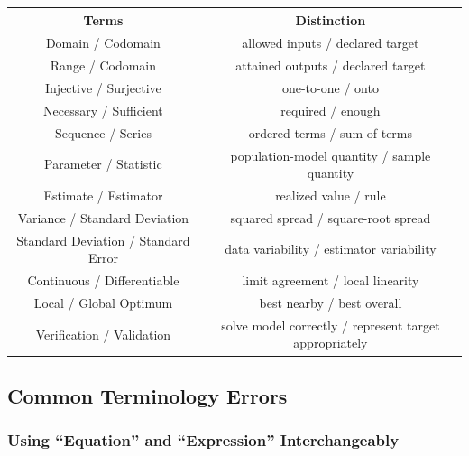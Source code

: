 \begin{center}
\begin{tabular}{c|c}
\textbf{Terms}
&
\textbf{Distinction}
\\ \hline

Domain / Codomain
&
allowed inputs / declared target
\\

Range / Codomain
&
attained outputs / declared target
\\

Injective / Surjective
&
one-to-one / onto
\\

Necessary / Sufficient
&
required / enough
\\

Sequence / Series
&
ordered terms / sum of terms
\\

Parameter / Statistic
&
population-model quantity / sample quantity
\\

Estimate / Estimator
&
realized value / rule
\\

Variance / Standard Deviation
&
squared spread / square-root spread
\\

Standard Deviation / Standard Error
&
data variability / estimator variability
\\

Continuous / Differentiable
&
limit agreement / local linearity
\\

Local / Global Optimum
&
best nearby / best overall
\\

Verification / Validation
&
solve model correctly / represent target appropriately
\end{tabular}
\end{center}

\subsection{Common Terminology Errors}
\label{subsec:terminology-common-errors}

\subsubsection{Using ``Equation'' and ``Expression'' Interchangeably}

